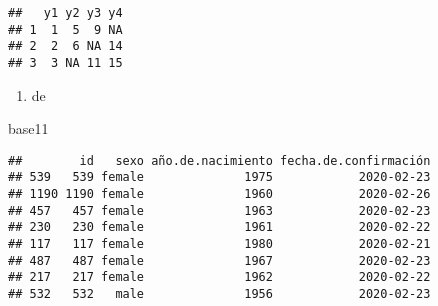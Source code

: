 \documentclass[]{article}
\newenvironment{Shaded}{\begin{snugshade}}{\end{snugshade}}
\newcommand{\KeywordTok}[1]{\textcolor[rgb]{0.13,0.29,0.53}{\textbf{#1}}}
\newcommand{\DecValTok}[1]{\textcolor[rgb]{0.00,0.00,0.81}{#1}}
\newcommand{\StringTok}[1]{\textcolor[rgb]{0.31,0.60,0.02}{#1}}
\newcommand{\OtherTok}[1]{\textcolor[rgb]{0.56,0.35,0.01}{#1}}
\newcommand{\OperatorTok}[1]{\textcolor[rgb]{0.81,0.36,0.00}{\textbf{#1}}}
\newcommand{\NormalTok}[1]{#1}
\providecommand{\tightlist}{%
  \setlength{\itemsep}{0pt}\setlength{\parskip}{0pt}}
\begin{document}
\begin{Shaded}
\end{Shaded}

\begin{verbatim}
##   y1 y2 y3 y4
## 1  1  5  9 NA
## 2  2  6 NA 14
## 3  3 NA 11 15
\end{verbatim}

\begin{enumerate}
\def\labelenumi{\alph{enumi}.}
\setcounter{enumi}{3}
\tightlist
\item
  de
\end{enumerate}

\begin{Shaded}
\begin{Highlighting}[]
\NormalTok{base11}
\end{Highlighting}
\end{Shaded}

\begin{verbatim}
##        id   sexo año.de.nacimiento fecha.de.confirmación
## 539   539 female              1975            2020-02-23
## 1190 1190 female              1960            2020-02-26
## 457   457 female              1963            2020-02-23
## 230   230 female              1961            2020-02-22
## 117   117 female              1980            2020-02-21
## 487   487 female              1967            2020-02-23
## 217   217 female              1962            2020-02-22
## 532   532   male              1956            2020-02-23
\end{verbatim}
\end{document}
